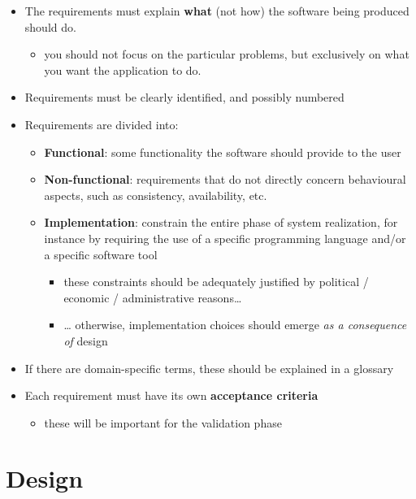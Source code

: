 \documentclass{scrartcl}
\begin{document}
\begin{itemize}
  \item The requirements must explain \textbf{what} (not how) the software
  being produced should do.

  \begin{itemize}
    \item you should not focus on the particular problems, but exclusively on
    what you want the application to do.
  \end{itemize}
  \item Requirements must be clearly identified, and possibly numbered
  \item Requirements are divided into:

  \begin{itemize}
    \item \textbf{Functional}: some functionality the software should provide
    to the user
    \item \textbf{Non-functional}: requirements that do not directly concern
    behavioural aspects, such as consistency, availability, etc.
    \item \textbf{Implementation}: constrain the entire phase of system
    realization, for instance by requiring the use of a specific
    programming language and/or a specific software tool

    \begin{itemize}
      \item these constraints should be adequately justified by political /
      economic / administrative reasons\ldots{}
      \item \ldots{} otherwise, implementation choices should emerge \emph{as
      a consequence of} design
    \end{itemize}
  \end{itemize}
  \item If there are domain-specific terms, these should be explained in a
  glossary
  \item Each requirement must have its own \textbf{acceptance criteria}

  \begin{itemize}
    \item these will be important for the validation phase
  \end{itemize}
\end{itemize}

\section{Design}\label{design}
\end{document}
